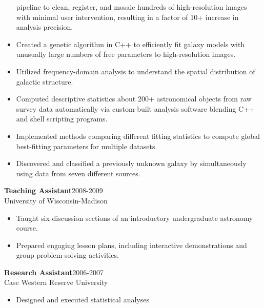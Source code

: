 \documentclass[11pt]{res}
\begin{document}
\begin{resume}
\begin{itemize}
                     pipeline to clean, register, and
                     mosaic hundreds of high-resolution images with
                     minimal user intervention, resulting in a factor
                     of 10+ increase in analysis precision.
                   \item Created a genetic
                     algorithm in C++ to efficiently fit galaxy models with
                     unusually large numbers of
                     free parameters to high-resolution images.
                   \item Utilized frequency-domain analysis to
                     understand the spatial distribution of galactic structure.
                  \item Computed descriptive statistics about
                    200+ astronomical objects from raw survey data
                    automatically via custom-built analysis software
                    blending C++ and shell scripting programs.
                  \item Implemented methods comparing different
                    fitting statistics to compute global best-fitting
                    parameters for multiple datasets. 
                  \item Discovered and classified a previously unknown
                    galaxy by simultaneously using data from seven different sources. 
                  \end{itemize} 
\vspace {-0.15 in}
{\bf Teaching Assistant}\hfill\mbox{2008-2009}\\
University of Wisconsin-Madison
\vspace*{0.01 in}\begin{itemize}\itemsep -2pt
\item Taught six discussion sections of an introductory undergraduate
  astronomy course.
\item Prepared engaging lesson plans, including interactive demonstrations and
  group problem-solving activities.
\end{itemize}
\vspace{-0.15 in}
{\bf Research Assistant}\hfill\mbox{2006-2007}\\
Case Western Reserve University
                  \vspace* {0.01 in}\begin{itemize} \itemsep -2pt
                    \item Designed and executed statistical analyses

\end{itemize}
\end{resume}
\end{document}

